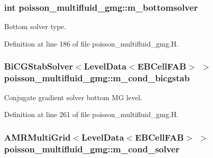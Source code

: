 \subsubsection[{\texorpdfstring{m\+\_\+bottomsolver}{m_bottomsolver}}]{\setlength{\rightskip}{0pt plus 5cm}int poisson\+\_\+multifluid\+\_\+gmg\+::m\+\_\+bottomsolver\hspace{0.3cm}{\ttfamily [protected]}}\hypertarget{classpoisson__multifluid__gmg_ab847ca230bc714ae3bca57d7ee8435ed}{}\label{classpoisson__multifluid__gmg_ab847ca230bc714ae3bca57d7ee8435ed}


Bottom solver type. 



Definition at line 186 of file poisson\+\_\+multifluid\+\_\+gmg.\+H.

\subsubsection[{\texorpdfstring{m\+\_\+cond\+\_\+bicgstab}{m_cond_bicgstab}}]{\setlength{\rightskip}{0pt plus 5cm}Bi\+C\+G\+Stab\+Solver$<$Level\+Data$<$E\+B\+Cell\+F\+AB$>$ $>$ poisson\+\_\+multifluid\+\_\+gmg\+::m\+\_\+cond\+\_\+bicgstab\hspace{0.3cm}{\ttfamily [protected]}}\hypertarget{classpoisson__multifluid__gmg_a5ec223edbc016dacab78c4aca79abdd0}{}\label{classpoisson__multifluid__gmg_a5ec223edbc016dacab78c4aca79abdd0}


Conjugate gradient solver bottom MG level. 



Definition at line 261 of file poisson\+\_\+multifluid\+\_\+gmg.\+H.

\subsubsection[{\texorpdfstring{m\+\_\+cond\+\_\+solver}{m_cond_solver}}]{\setlength{\rightskip}{0pt plus 5cm}A\+M\+R\+Multi\+Grid$<$Level\+Data$<$E\+B\+Cell\+F\+AB$>$ $>$ poisson\+\_\+multifluid\+\_\+gmg\+::m\+\_\+cond\+\_\+solver\hspace{0.3cm}{\ttfamily [protected]}}\hypertarget{classpoisson__multifluid__gmg_aff9ba8c258a0f2cabd8230e11d5c9da0}{}\label{classpoisson__multifluid__gmg_aff9ba8c258a0f2cabd8230e11d5c9da0}


